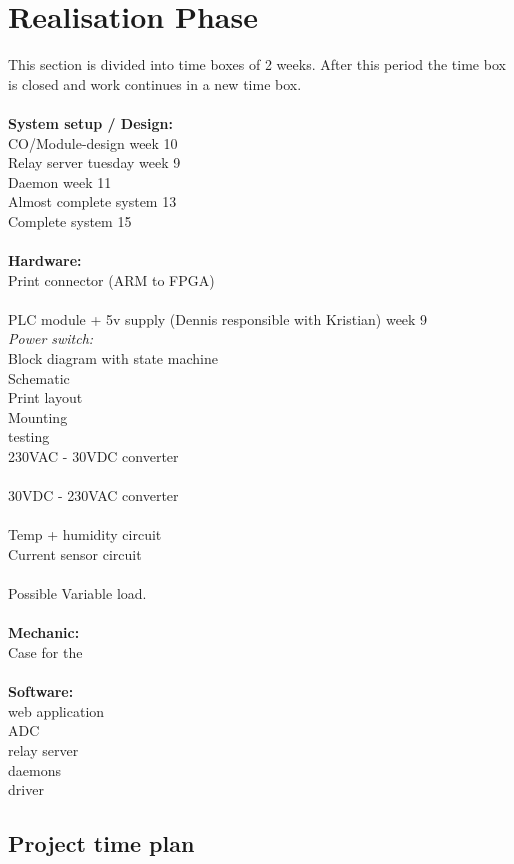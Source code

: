\chapter{Realisation Phase}
This section is divided into time boxes of 2 weeks. After this period the time box is closed and work continues in a new time box.\\
\\
\textbf{System setup / Design:}\\
CO/Module-design week 10\\
Relay server tuesday week 9\\
Daemon week 11\\
Almost complete system 13\\
Complete system 15\\
\\
\textbf{Hardware:}\\
Print connector (ARM to FPGA)\\
\\
PLC module + 5v supply (Dennis responsible with Kristian) week 9\\
\textit{Power switch:}\\
	Block diagram with state machine\\
	Schematic\\
	Print layout\\
	Mounting\\
	testing\\
230VAC - 30VDC converter\\
\\
30VDC - 230VAC converter\\
\\
Temp + humidity circuit\\
Current sensor circuit\\
\\
Possible Variable load.\\
\\
\textbf{Mechanic:}\\
Case for the \\
\\
\textbf{Software:}\\
web application\\
ADC\\
relay server\\
daemons\\
driver\\


\section{Project time plan}\newpage
\newpage
\newpage
\newpage
\newpage
\newpage
\newpage
\newpage
